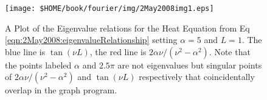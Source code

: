 
\begin{figure}[ht]
\texttt{[image: \$HOME/book/fourier/img/2May2008img1.eps]}
\caption[Eigenvalue Relations for Heat Equation]{A Plot of
  the Eigenvalue relations for the Heat Equation from Eq
  \eqref{eqn:2May2008:eigenvalueRelationship} setting
  $\alpha=5$ and $L=1$. The blue line is $\tan(\nu L)$, the
  red line is $2\alpha\nu/(\nu^2-\alpha^2)$. Note that the
  points labeled $\alpha$ and $2.5\pi$ are not eigenvalues
  but singular points of $2\alpha\nu/(\nu^2-\alpha^2)$ and
  $\tan(\nu L)$ respectively that coincidentally overlap in
  the graph program.}\label{fig:2May2008:eigenPlot}
\end{figure}

